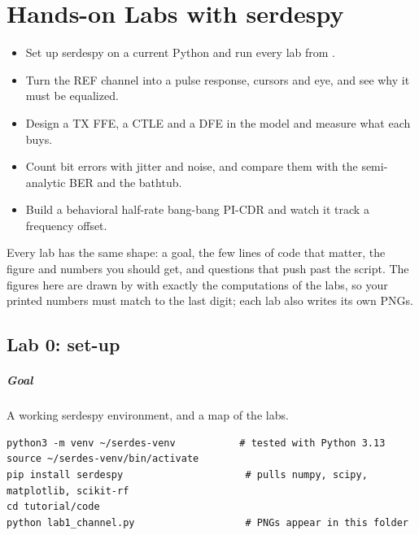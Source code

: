 \chapter{Hands-on Labs with serdespy}\label{ch:labs}


\begin{objectives}
\begin{itemize}
  \item Set up serdespy on a current Python and run every lab from .
  \item Turn the REF channel into a pulse response, cursors and eye, and see why it must be equalized.
  \item Design a TX FFE, a CTLE and a DFE in the model and measure what each buys.
  \item Count bit errors with jitter and noise, and compare them with the semi-analytic BER and the bathtub.
  \item Build a behavioral half-rate bang-bang PI-CDR and watch it track a frequency offset.
\end{itemize}
\end{objectives}

Every lab has the same shape: a goal, the few lines of code that matter, the figure and numbers you should get, and questions that push past the script. The figures here are drawn by  with exactly the computations of the labs, so your printed numbers must match to the last digit; each lab also writes its own PNGs.

\section{Lab 0: set-up}\label{sec:lab0}

\paragraph{Goal} A working serdespy environment, and a map of the labs.

\begin{lstlisting}[style=shell]
python3 -m venv ~/serdes-venv           # tested with Python 3.13
source ~/serdes-venv/bin/activate
pip install serdespy                     # pulls numpy, scipy, matplotlib, scikit-rf
cd tutorial/code
python lab1_channel.py                   # PNGs appear in this folder
\end{lstlisting}

